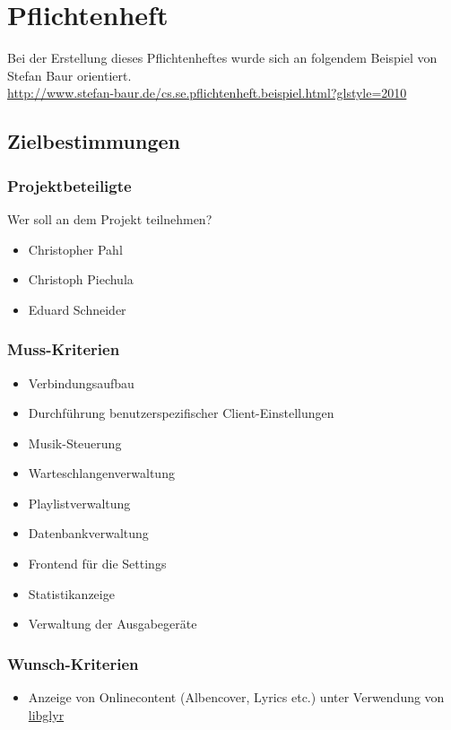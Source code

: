 \chapter{Pflichtenheft}
Bei der Erstellung dieses Pflichtenheftes wurde sich an folgendem Beispiel von Stefan Baur orientiert. \\
\url{http://www.stefan-baur.de/cs.se.pflichtenheft.beispiel.html?glstyle=2010}

\section{Zielbestimmungen}
\subsection{Projektbeteiligte}
Wer soll an dem Projekt teilnehmen?
\begin{itemize}
        \item Christopher Pahl
        \item Christoph Piechula
        \item Eduard Schneider
\end{itemize}
\subsection{Muss-Kriterien}
\renewcommand{\labelitemi}{•}
\begin{itemize}
	\item Verbindungsaufbau
	\item Durchführung benutzerspezifischer Client-Einstellungen
	\item Musik-Steuerung
	\item Warteschlangenverwaltung
	\item Playlistverwaltung
	\item Datenbankverwaltung
	\item Frontend für die Settings
	\item Statistikanzeige
	\item Verwaltung der Ausgabegeräte
\end{itemize}
\subsection{Wunsch-Kriterien}
\begin{itemize}
    \item Anzeige von Onlinecontent (Albencover, Lyrics etc.) unter Verwendung von \href{https://github.com/sahib/glyr}{libglyr}
\end{itemize}

